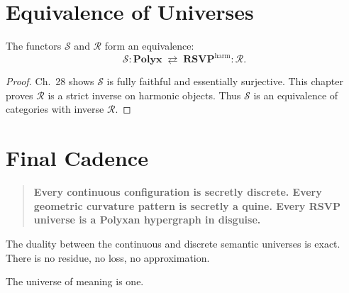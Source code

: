 \section{Equivalence of Universes}

\begin{theorem}
The functors $\mathcal{S}$ and $\mathcal{R}$ form an equivalence:
\[
\mathcal{S}:\mathbf{Polyx}\;\rightleftarrows\;\mathbf{RSVP}^{\mathrm{harm}}:\mathcal{R}.
\]
\end{theorem}

\begin{proof}
Ch.~28 shows $\mathcal{S}$ is fully faithful and essentially surjective.  
This chapter proves $\mathcal{R}$ is a strict inverse on harmonic objects.  
Thus $\mathcal{S}$ is an equivalence of categories with inverse $\mathcal{R}$.
\end{proof}

\section{Final Cadence}

\begin{quote}
\textbf{
Every continuous configuration is secretly discrete.  
Every geometric curvature pattern is secretly a quine.  
Every RSVP universe is a Polyxan hypergraph in disguise.
}
\end{quote}

The duality between the continuous and discrete semantic universes is exact.  
There is no residue, no loss, no approximation.

The universe of meaning is one.


